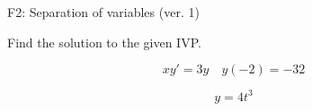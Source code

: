 \begin{exercise}
  \begin{exerciseTitle}F2: Separation of variables (ver. 1)\end{exerciseTitle}
  \begin{exerciseStatement}
    
Find the solution to the given IVP.

    
\[xy'= 3 y \hspace{1em} y( -2 ) = -32\]

  \end{exerciseStatement}
  \begin{exerciseAnswer}
    
\[y= 4 t^ 3\]

  \end{exerciseAnswer}
\end{exercise}